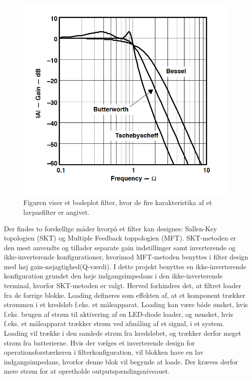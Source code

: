 \begin{figure}[H]
	\centering
	\includegraphics[scale=0.7]{figures/cProblemloesning/type_filtre.PNG}
	\caption{Figuren viser et bodeplot filter, hvor de fire karakteristika af et lavpasfilter er angivet. \cite{Carter2013}}
	\label{fig:type_filtre}
\end{figure}

Der findes to forskellige måder hvorpå et filter kan designes: Sallen-Key topologien (SKT) og Multiple Feedback toppologien (MFT). SKT-metoden er den mest anvendte og tillader separate gain indstillinger samt inverterende og ikke-inverterende konfigurationer, hvorimod MFT-metoden benyttes i filter design med høj gain-nøjagtighed(Q-værdi). I dette projekt benyttes en ikke-inverterende konfiguration grundet den høje indgangsimpedans i den ikke-inverterende terminal, hvorfor SKT-metoden er valgt. Herved forhindres det, at filtret loader fra de forrige blokke. Loading defineres som effekten af, at et komponent trækker strømmen i et kredsløb f.eks. et måleapparat. Loading kan være både ønsket, hvis f.eks. brugen af strøm til aktivering af en LED-diode loader, og uønsket, hvis f.eks. et måleapparat trækker strøm ved afmåling af et signal, i et system. Loading vil trække i den samlede strøm fra kredsløbet, og trækker derfor meget strøm fra batterierne. Hvis der vælges et inverterende design for operationsforstærkeren i filterkonfiguration, vil blokken have en lav indgangsimpedans, hvorfor denne blok vil begynde at loade. Der kræves derfor mere strøm for at opretholde outputspændingsniveauet. \cite{Webster2009,Carter2013,Karni2014}

